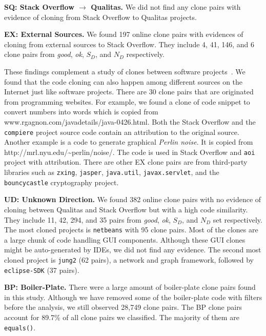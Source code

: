 \documentclass[sigconf,review, anonymous]{acmart}
\begin{document}
\textbf{SQ: Stack Overflow $\rightarrow$ Qualitas.} We did not find any clone pairs with evidence of cloning from Stack Overflow to Qualitas projects.

\textbf{EX: External Sources.} We found 197 online clone pairs with evidences of cloning from external sources to Stack Overflow. They include 4, 41, 146, and 6 clone pairs from \textit{good}, \textit{ok}, $S_D$, and $N_D$ respectively.

These findings complement a study of clones between software projects~\cite{Svajlenko2014}. We found that the code cloning can also happen among different sources on the Internet just like software projects. There are 30 clone pairs that are originated from programming websites. For example, we found a clone of code snippet to convert numbers into words which is copied from www.rgagnon.com/javadetails/java-0426.html. Both the Stack Overflow and the {\small\texttt{compiere}} project source code contain an attribution to the original source. Another example is a code to generate graphical \textit{Perlin noise}. It is copied from http://mrl.nyu.edu/\textasciitilde perlin/noise/. The code is used in Stack Overflow and {\small\texttt{aoi}} project with attribution. %
There are other EX clone pairs are from third-party libraries such as {\small\texttt{zxing}}, {\small\texttt{jasper}}, {\small\texttt{java.util}}, {\small\texttt{javax.servlet}}, and the {\small\texttt{bouncycastle}} cryptography project.

\textbf{UD: Unknown Direction.} We found 382 online clone pairs with no evidence of cloning between Qualitas and Stack Overflow but with a high code similarity. They include 11, 42, 294, and 35 pairs from \textit{good}, \textit{ok}, $S_D$, and $N_D$ set respectively. The most cloned projects is {\small{\texttt{netbeans}}} with 95 clone pairs. Most of the clones are a large chunk of code handling GUI components. Although these GUI clones might be auto-generated by IDEs, we did not find any evidence. The second most cloned project is {\small{\texttt{jung2}}} (62 pairs), a network and graph framework, followed by {\small{\texttt{eclipse-SDK}}} (37 pairs). %

\textbf{BP: Boiler-Plate.} There were a large amount of boiler-plate clone pairs found in this study. Although we have removed some of the boiler-plate code with filters before the analysis, we still observed 28,749 clone pairs. The BP clone pairs account for 89.7\% of all clone pairs we classified. The majority of them are {\small{\texttt{equals()}}}.
\end{document}
